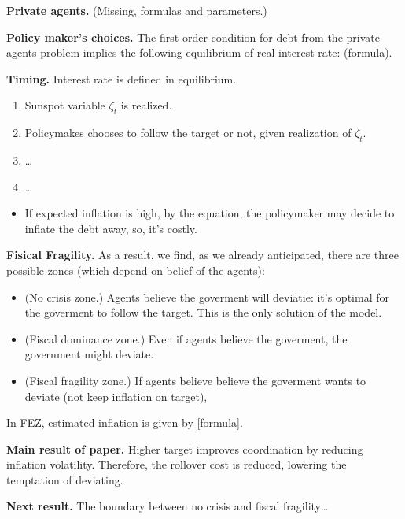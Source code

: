 \medskip\noindent
{\bf Private agents.} (Missing, formulas and
parameters.)


\medskip\noindent
{\bf Policy maker's choices.}
The first-order condition for debt from the
private agents problem implies the following
equilibrium of real interest rate:
(formula).

\medskip\noindent
{\bf Timing.} Interest rate is defined in
equilibrium.

\begin{enumerate}
\item Sunspot variable $\zeta_t$ is
realized.
\item Policymakes chooses to follow the
target or not, given realization of
$\zeta_t$.
\item …
\item …
\end{enumerate}

\begin{itemize}
\item If expected inflation is high,
by the equation, the policymaker may decide
to inflate the debt away, so, it's costly.
\end{itemize}

\medskip\noindent
{\bf Fisical Fragility.}
As a result, we find, as we already
anticipated, there are three possible zones
(which depend on belief of the agents):

\begin{itemize}
\item (No crisis zone.) 
Agents believe the goverment will
deviatie: it's optimal for the goverment to
follow the target. This is the only solution
of the model.

\item (Fiscal dominance zone.) Even if agents believe the goverment,
the government might deviate.

\item (Fiscal fragility zone.) If agents believe believe the
goverment wants to deviate (not keep
inflation on target),
\end{itemize}

\noindent
In FEZ, estimated inflation is given by
[formula].

\medskip\noindent
{\bf Main result of paper.}
Higher target improves coordination by
reducing inflation volatility.
Therefore, the rollover cost is reduced,
lowering the temptation of deviating.

\medskip\noindent
{\bf Next result.}
The boundary between no crisis and fiscal
fragility…

